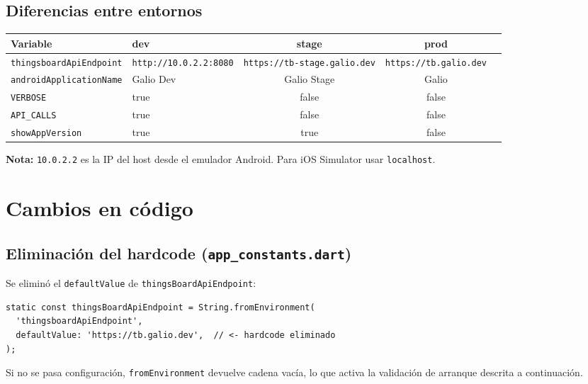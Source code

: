 \documentclass[12pt, a4paper]{article}
\begin{document}
\subsection{Diferencias entre entornos}

\begin{center}
\begin{tabular}{llccc}
  \toprule
  \textbf{Variable} & \textbf{dev} & \textbf{stage} & \textbf{prod} \\
  \midrule
  \texttt{thingsboardApiEndpoint} & \texttt{http://10.0.2.2:8080} & \texttt{https://tb-stage.galio.dev} & \texttt{https://tb.galio.dev} \\
  \texttt{androidApplicationName} & Galio Dev & Galio Stage & Galio \\
  \texttt{VERBOSE} & true & false & false \\
  \texttt{API\_CALLS} & true & false & false \\
  \texttt{showAppVersion} & true & true & false \\
  \bottomrule
\end{tabular}
\end{center}

\textbf{Nota:} \texttt{10.0.2.2} es la IP del host desde el emulador Android.
Para iOS Simulator usar \texttt{localhost}.

\section{Cambios en código}

\subsection{Eliminación del hardcode (\texttt{app\_constants.dart})}

Se eliminó el \texttt{defaultValue} de \texttt{thingsBoardApiEndpoint}:

\begin{lstlisting}[style=json, language={}, caption=lib/constants/app\_constants.dart (antes)]
static const thingsBoardApiEndpoint = String.fromEnvironment(
  'thingsboardApiEndpoint',
  defaultValue: 'https://tb.galio.dev',  // <- hardcode eliminado
);
\end{lstlisting}

Si no se pasa configuración, \texttt{fromEnvironment} devuelve cadena vacía,
lo que activa la validación de arranque descrita a continuación.
\end{document}
